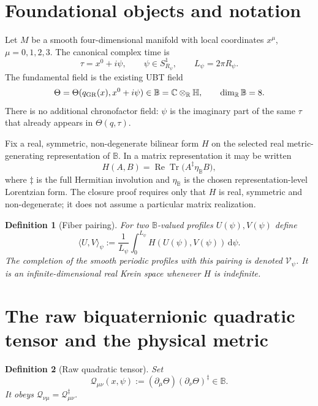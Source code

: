 \documentclass[11pt,a4paper]{article}
\newtheorem{definition}{Definition}[section]
\theoremstyle{remark}
\newcommand{\B}{\mathbb B}
\newcommand{\dd}{\mathrm d}
\begin{document}
\section{Foundational objects and notation}

Let $M$ be a smooth four-dimensional manifold with local coordinates
$x^\mu$, $\mu=0,1,2,3$.  The canonical complex time is
\begin{equation}
  \tau=x^0+i\psi,
  \qquad \psi\in S^1_{R_\psi},
  \qquad L_\psi=2\pi R_\psi.
\end{equation}
The fundamental field is the existing UBT field
\begin{equation}
  \Theta=\Theta(q_{\rm GR}(x),x^0+i\psi)\in\B
  =\mathbb C\otimes_{\mathbb R}\mathbb H,
  \qquad \dim_{\mathbb R}\B=8.
\end{equation}
There is no additional chronofactor field: $\psi$ is the imaginary part of the
same $\tau$ that already appears in $\Theta(q,\tau)$.

Fix a real, symmetric, non-degenerate bilinear form $H$ on the selected real
metric-generating representation of $\B$.  In a matrix representation it may be
written
\begin{equation}
  H(A,B)=\operatorname{Re}\operatorname{Tr}
  \bigl(A^\ddagger\eta_{\B}B\bigr),
  \label{eq:H}
\end{equation}
where $\ddagger$ is the full Hermitian involution and $\eta_{\B}$ is the chosen
representation-level Lorentzian form.  The closure proof requires only that
$H$ is real, symmetric and non-degenerate; it does not assume a particular
matrix realization.

\begin{definition}[Fiber pairing]
For two $\B$-valued profiles $U(\psi),V(\psi)$ define
\begin{equation}
  \langle U,V\rangle_\psi
  :=\frac1{L_\psi}\int_0^{L_\psi}H(U(\psi),V(\psi))\,\dd\psi.
  \label{eq:fiberpair}
\end{equation}
The completion of the smooth periodic profiles with this pairing is denoted
$\mathscr V_\psi$.  It is an infinite-dimensional real Krein space whenever
$H$ is indefinite.
\end{definition}

\section{The raw biquaternionic quadratic tensor and the physical metric}

\begin{definition}[Raw quadratic tensor]
Set
\begin{equation}
  \mathcal Q_{\mu\nu}(x,\psi)
  :=(\partial_\mu\Theta)(\partial_\nu\Theta)^\ddagger\in\B.
  \label{eq:rawQ}
\end{equation}
It obeys $\mathcal Q_{\nu\mu}=\mathcal Q_{\mu\nu}^\ddagger$.
\end{definition}
\end{document}
